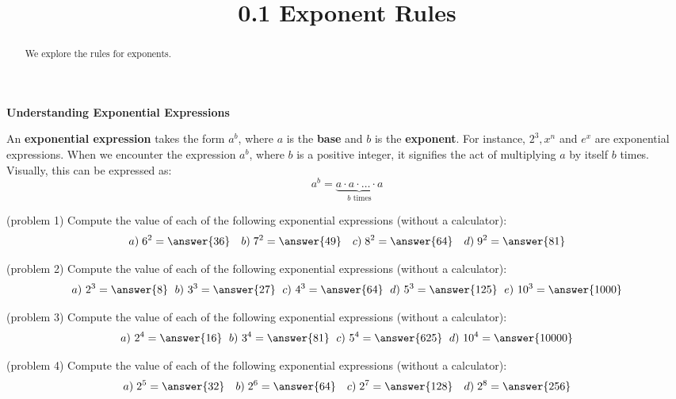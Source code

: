 \documentclass[handout]{ximera}
\title{0.1 Exponent Rules}
\begin{document}
\begin{abstract}
We explore the rules for exponents.
\end{abstract}



\maketitle

\begin{center}
\textbf{Understanding Exponential Expressions}
\end{center}

An \textbf{exponential expression} takes the form $a^b$, where $a$ is the \textbf{base}  and 
$b$ is the \textbf{exponent}.
For instance, $2^3, x^n$ and $e^x$ are exponential expressions. 
When we encounter the expression $a^b$, 
where $b$ is a positive integer, it signifies the act of multiplying $a$
by itself $b$ times. Visually, this can be expressed as:
\[
a^b = \underbrace{a \cdot a \cdot \ldots \cdot a}_\text{$b$ times} 
\]


\begin{problem}(problem 1)
Compute the value of each of the following exponential expressions (without a calculator):
\[
a) \;6^2 = \answer{36} \quad b) \;7^2 = \answer{49} \quad c) \;8^2 = \answer{64} \quad d) \;9^2 = \answer{81}
\]
\end{problem}

\begin{problem}(problem 2)
Compute the value of each of the following exponential expressions (without a calculator):
\[
a) \ 2^3 = \answer{8} \; \ b) \ 3^3 = \answer{27} \; \  c) \ 4^3 = \answer{64} \; \  d) \ 5^3 = \answer{125} 
 \; \  e) \ 10^3 = \answer{1000}
\]
\end{problem}

\begin{problem}(problem 3)
Compute the value of each of the following exponential expressions (without a calculator):
\[
a) \ 2^4 = \answer{16} \; \  b) \ 3^4 = \answer{81} \; \  c) \ 5^4 = \answer{625} \; \ d) \ 10^4 = \answer{10000}
\]
\end{problem}

\begin{problem}(problem 4)
Compute the value of each of the following exponential expressions (without a calculator):
\[
a) \;2^5 = \answer{32} \quad b) \;2^6 = \answer{64} \quad c) \;2^7 = \answer{128} \quad d) \;2^8 = \answer{256}
\]
\end{problem}
\end{document}
